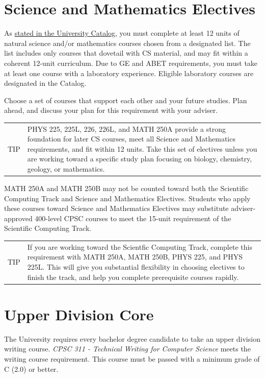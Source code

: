 \documentclass{book}
\newenvironment{tip}
               {\tcolorbox \begin{tabular}{m{.5in} m{5in}} \Large{TIP} & }
               {\end{tabular} \endtcolorbox}
\begin{document}
\section{Science and Mathematics Electives}

As \href{http://catalog.fullerton.edu/preview_program.php?catoid=2&poid=537&returnto=137}{stated in the University Catalog}, you must complete at least 12 units of natural science and/or mathematics courses chosen from a designated list. The list includes only courses that dovetail with CS material, and may fit within a coherent 12-unit curriculum. Due to GE and ABET requirements, you must take at least one course with a laboratory experience. Eligible laboratory courses are designated in the Catalog.

Choose a set of courses that support each other and your future studies. Plan ahead, and discuss your plan for this requirement with your adviser.

\begin{tip}
PHYS 225, 225L, 226, 226L, and MATH 250A provide a strong foundation for later CS courses, meet all Science and Mathematics requirements, and fit within 12 units. Take this set of electives unless you are working toward a specific study plan focusing on biology, chemistry, geology, or mathematics.
\end{tip}

MATH 250A and MATH 250B may not be counted toward both the Scientific Computing Track  and Science and Mathematics Electives. Students who apply these courses toward Science and Mathematics Electives may substitute adviser-approved 400-level CPSC courses to meet the 15-unit requirement of the Scientific Computing Track.

\begin{tip}
If you are working toward the Scientfic Computing Track, complete this requirement with  MATH 250A, MATH 250B, PHYS 225, and PHYS 225L. This will give you substantial flexibility in choosing electives to finish the track, and help you complete prerequisite courses rapidly.
\end{tip}

\section{Upper Division Core}

The University requires every bachelor degree candidate to take an upper division writing course. \emph{CPSC 311 - Technical Writing for Computer Science} meets the writing course requirement. This course must be passed with a minimum grade of C (2.0) or better.
\end{document}
